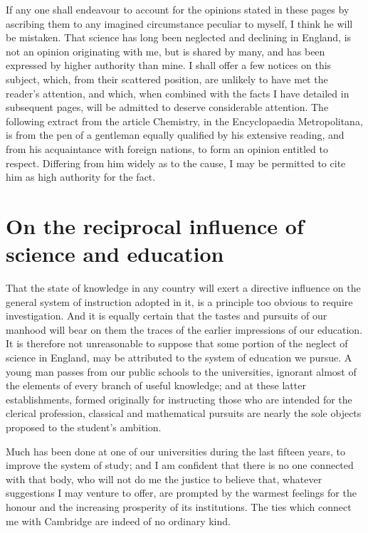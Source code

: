 \documentclass{aa}
\begin{document}
If any one shall endeavour to account for the opinions stated in these
pages by ascribing them to any imagined circumstance peculiar to myself,
I think he will be mistaken. That science has long been neglected and
declining in England, is not an opinion originating with me, but is
shared by many, and has been expressed by higher authority than mine. I
shall offer a few notices on this subject, which, from their scattered
position, are unlikely to have met the reader's attention, and which,
when combined with the facts I have detailed in subsequent pages, will
be admitted to deserve considerable attention. The following extract
from the article Chemistry, in the Encyclopaedia Metropolitana, is from
the pen of a gentleman equally qualified by his extensive reading, and
from his acquaintance with foreign nations, to form an opinion entitled
to respect. Differing from him widely as to the cause, I may be
permitted to cite him as high authority for the fact.


\section{On the reciprocal influence of science and education}

That the state of knowledge in any country will exert a directive
influence on the general system of instruction adopted in it, is a
principle too obvious to require investigation. And it is equally
certain that the tastes and pursuits of our manhood will bear on them
the traces of the earlier impressions of our education. It is therefore
not unreasonable to suppose that some portion of the neglect of science
in England, may be attributed to the system of education we pursue. A
young man passes from our public schools to the universities, ignorant
almost of the elements of every branch of useful knowledge; and at these
latter establishments, formed originally for instructing those who
are intended for the clerical profession, classical and mathematical
pursuits are nearly the sole objects proposed to the student's ambition.

Much has been done at one of our universities during the last fifteen
years, to improve the system of study; and I am confident that there
is no one connected with that body, who will not do me the justice to
believe that, whatever suggestions I may venture to offer, are prompted
by the warmest feelings for the honour and the increasing prosperity of
its institutions. The ties which connect me with Cambridge are indeed of
no ordinary kind.
\end{document}

